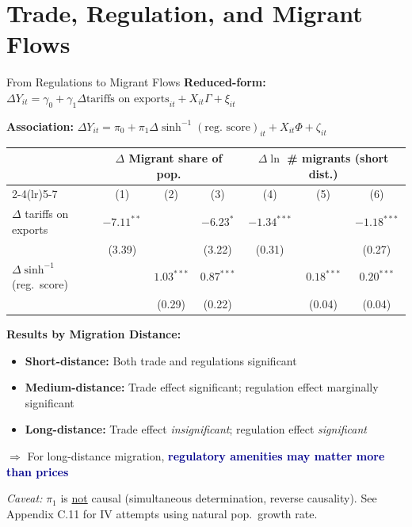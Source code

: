 \documentclass[10pt,aspectratio=169,t]{beamer}
\newcommand{\hlight}[1]{\textcolor{darkblue}{\textbf{#1}}}
\newcommand{\rmark}[1]{\textcolor{alertred}{#1}}
\newcommand{\asinh}{\operatorname{sinh}^{-1}}
\begin{document}
\section{Trade, Regulation, and Migrant Flows}

\begin{frame}{From Regulations to Migrant Flows}
\textbf{Reduced-form:} $\Delta Y_{it} = \gamma_0 + \gamma_1 \Delta\text{tariffs on exports}_{it} + X_{it}\Gamma + \xi_{it}$

\textbf{Association:} $\Delta Y_{it} = \pi_0 + \pi_1 \Delta\asinh(\text{reg.\ score})_{it} + X_{it}\Phi + \zeta_{it}$

\begin{table}[h]
\centering\footnotesize
\setlength{\tabcolsep}{3pt}
\begin{tabular}{@{}l*{6}{c}@{}}
\toprule
& \multicolumn{3}{c}{$\Delta$ Migrant share of pop.} & \multicolumn{3}{c}{$\Delta\ln$ \# migrants (short dist.)} \\
\cmidrule(lr){2-4}\cmidrule(lr){5-7}
& (1) & (2) & (3) & (4) & (5) & (6) \\
\midrule
$\Delta$ tariffs on exports & $-7.11^{**}$ & & $-6.23^*$ & $-1.34^{***}$ & & $-1.18^{***}$ \\
& (3.39) & & (3.22) & (0.31) & & (0.27) \\[3pt]
$\Delta\asinh$(reg.\ score) & & $1.03^{***}$ & $0.87^{***}$ & & $0.18^{***}$ & $0.20^{***}$ \\
& & (0.29) & (0.22) & & (0.04) & (0.04) \\
\bottomrule
\end{tabular}
\end{table}

\medskip
\textbf{Results by Migration Distance:}
\begin{itemize}
    \item \textbf{Short-distance:} Both trade and regulations significant
    \item \textbf{Medium-distance:} Trade effect significant; regulation effect marginally significant
    \item \textbf{Long-distance:} Trade effect \textit{insignificant}; regulation effect \textit{significant}
\end{itemize}

\rmark{$\Rightarrow$} For long-distance migration, \hlight{regulatory amenities may matter more than prices}

\medskip
\footnotesize
\textit{Caveat:} $\pi_1$ is \underline{not} causal (simultaneous determination, reverse causality). See Appendix C.11 for IV attempts using natural pop.\ growth rate.
\end{frame}
\end{document}
